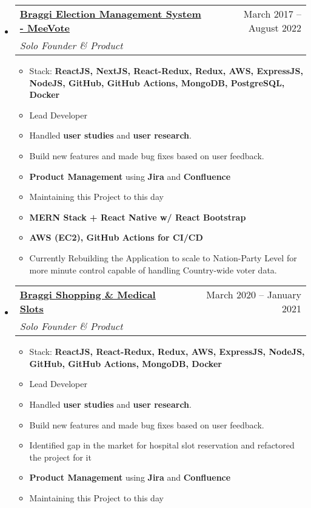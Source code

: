 \documentclass[a4paper,11pt]{article}
\makeatletter
\newcommand{\resumeItem}[1]{
  \item\large{#1}
}
\newcommand{\resumeItemListStart}{\begin{itemize}[rightmargin=0.11in]}
\newcommand{\resumeItemListEnd}{\end{itemize}}
\newcommand{\resumeQuadHeading}[4]{
  \item
  \begin{tabular*}{0.96\textwidth}[t]{l@{\extracolsep{\fill}}r}
    \textbf{#1} & #2 \\
    \textit{\large#3} & \textit{\large #4} \\
  \end{tabular*}
}
\newcommand{\resumeHeadingListStart}{
  \begin{itemize}[leftmargin=0.15in, label={}]
}
\newcommand{\resumeHeadingListEnd}{\end{itemize}}
\makeatother
\begin{document}
  \resumeHeadingListStart{}
  \resumeQuadHeading{{\uline{Braggi Election Management System - MeeVote
}}}{March 2017 -- August 2022}
  {Solo Founder \& Product}{}
      \resumeItemListStart{}
		\large{This was the first project that I built, which was out of my domain, the platform "MeeVote", is an Election Management System, built for those contesting in elections. MeeVote aims to help leaders better manage their party workers to ensure faster reach and acquisition of voters. Also since it's me, under the hood there's some fancy AI magic happening too! This is currently under going a major rewrite for Country-wide deployment and support for multiple national parties.
}
		\resumeItem{Stack: \textbf{ReactJS,
			NextJS,
			React-Redux,
			Redux,
			AWS,
			ExpressJS,
			NodeJS,
			GitHub,
			GitHub Actions,
			MongoDB,
			PostgreSQL,
			Docker}}
		\resumeItem{Lead Developer}
\resumeItem{Handled \textbf{user studies} and \textbf{user research}.}
		\resumeItem{Build new features and made bug fixes based on user feedback.}
		\resumeItem{\textbf{Product Management} using \textbf{Jira} and \textbf{Confluence}}
		\resumeItem{Maintaining this Project to this day}
		\resumeItem{\textbf{MERN Stack + React Native w/ React Bootstrap}}
		\resumeItem{\textbf{AWS (EC2), GitHub Actions for CI/CD}}
		\resumeItem{Currently Rebuilding the Application to scale to Nation-Party Level for more minute control capable of handling Country-wide voter data.}
      \resumeItemListEnd{}
  \resumeHeadingListEnd{}

  \resumeHeadingListStart{}
  \resumeQuadHeading{\href{https://shoppingslots.in/}{\uline{Braggi Shopping \& Medical Slots
}}}{March 2020 -- January 2021}
  {Solo Founder \& Product}{}
      \resumeItemListStart{}
		\large{During the lockdown, marketing is difficult, and getting work done remotely has been equally difficult, so I started working on a new project. Braggi's Shopping Slots platform took 2 weeks to build, it allows it's users to book a slot to shop at their local grocery store, the platform handles queues and allows shop owners to decide how many people they can accomodate on an hourly basis at their store, while ensuring that social distancing is followed. This was a fun project, because I deployed it much more quickly than anything before, while constantly working with the changing situations due to the pandemic, it's helped me greatly with my ability to understand the market as a whole and it's needs during times like these.}
		\resumeItem{Stack: \textbf{ReactJS,
			React-Redux,
			Redux,
			AWS,
			ExpressJS,
			NodeJS,
			GitHub,
			GitHub Actions,
			MongoDB,
			Docker}}
		\resumeItem{Lead Developer}
		\resumeItem{Handled \textbf{user studies} and \textbf{user research}.}
		\resumeItem{Build new features and made bug fixes based on user feedback.}
		\resumeItem{Identified gap in the market for hospital slot reservation and refactored the project for it}
		\resumeItem{\textbf{Product Management} using \textbf{Jira} and \textbf{Confluence}}
		\resumeItem{Maintaining this Project to this day}
      \resumeItemListEnd{}
  \resumeHeadingListEnd{}
\end{document}
